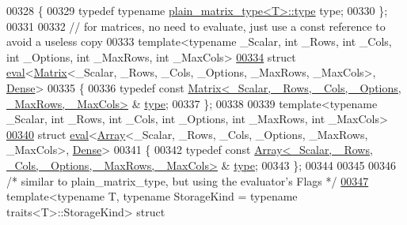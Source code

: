 \begin{DoxyCode}
{00328 \{
00329   \textcolor{keyword}{typedef} \textcolor{keyword}{typename} \hyperlink{struct_eigen_1_1internal_1_1plain__matrix__type}{plain\_matrix\_type<T>::type} type;
00330 \};
00331 
00332 \textcolor{comment}{// for matrices, no need to evaluate, just use a const reference to avoid a useless copy}
00333 \textcolor{keyword}{template}<\textcolor{keyword}{typename} \_Scalar, \textcolor{keywordtype}{int} \_Rows, \textcolor{keywordtype}{int} \_Cols, \textcolor{keywordtype}{int} \_Options, \textcolor{keywordtype}{int} \_MaxRows, \textcolor{keywordtype}{int} \_MaxCols>
\hyperlink{struct_eigen_1_1internal_1_1eval_3_01_matrix_3_01___scalar_00_01___rows_00_01___cols_00_01___opt9cfa1a2b5d36a2fa1d70e324e0b1c472}{00334} \textcolor{keyword}{struct }\hyperlink{struct_eigen_1_1internal_1_1eval}{eval}<\hyperlink{group___core___module_class_eigen_1_1_matrix}{Matrix}<\_Scalar, \_Rows, \_Cols, \_Options, \_MaxRows, \_MaxCols>, 
      \hyperlink{struct_eigen_1_1_dense}{Dense}>
00335 \{
00336   \textcolor{keyword}{typedef} \textcolor{keyword}{const} \hyperlink{group___core___module_class_eigen_1_1_matrix}{Matrix<\_Scalar, \_Rows, \_Cols, \_Options, \_MaxRows, \_MaxCols>}
      & \hyperlink{group___core___module_class_eigen_1_1_matrix}{type};
00337 \};
00338 
00339 \textcolor{keyword}{template}<\textcolor{keyword}{typename} \_Scalar, \textcolor{keywordtype}{int} \_Rows, \textcolor{keywordtype}{int} \_Cols, \textcolor{keywordtype}{int} \_Options, \textcolor{keywordtype}{int} \_MaxRows, \textcolor{keywordtype}{int} \_MaxCols>
\hyperlink{struct_eigen_1_1internal_1_1eval_3_01_array_3_01___scalar_00_01___rows_00_01___cols_00_01___optifb38e4e42f3aa82ee965fe5a912f110a}{00340} \textcolor{keyword}{struct }\hyperlink{struct_eigen_1_1internal_1_1eval}{eval}<\hyperlink{group___core___module_class_eigen_1_1_array}{Array}<\_Scalar, \_Rows, \_Cols, \_Options, \_MaxRows, \_MaxCols>, 
      \hyperlink{struct_eigen_1_1_dense}{Dense}>
00341 \{
00342   \textcolor{keyword}{typedef} \textcolor{keyword}{const} \hyperlink{group___core___module_class_eigen_1_1_array}{Array<\_Scalar, \_Rows, \_Cols, \_Options, \_MaxRows, \_MaxCols>}
      & \hyperlink{group___core___module_class_eigen_1_1_array}{type};
00343 \};
00344 
00345 
00346 \textcolor{comment}{/* similar to plain\_matrix\_type, but using the evaluator's Flags */}
\hyperlink{struct_eigen_1_1internal_1_1plain__object__eval}{00347} template<typename T, typename StorageKind = typename traits<T>::StorageKind> \textcolor{keyword}{struct }
}
\end{DoxyCode}
